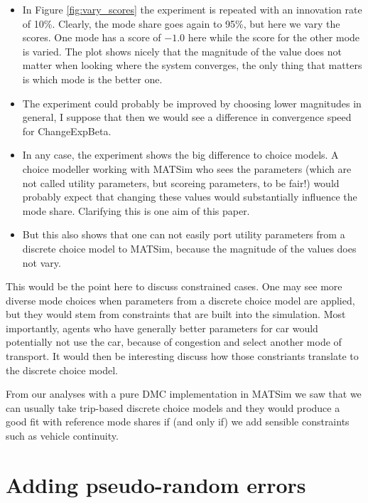 \documentclass[a4paper]{article}
\begin{document}
\begin{itemize}
  \item In Figure \ref{fig:vary_scores} the experiment is repeated with an
  innovation rate of 10\%. Clearly, the mode share goes again
  to 95\%, but here we vary the scores. One mode has a score of $-1.0$ here
  while the score for the other mode is varied. The plot shows nicely that
  the magnitude of the value does not matter when looking where the system
  converges, the only thing that matters is which mode is the better
  one.
  \item The experiment could probably be improved by choosing lower
  magnitudes in general, I suppose that then we would see a difference in
  convergence speed for ChangeExpBeta.
  \item In any case, the experiment shows the big difference to choice models.
  A choice modeller working with MATSim who sees the parameters (which are not
  called utility parameters, but scoreing parameters, to be fair!) would
  probably expect that changing these values would substantially influence
  the mode share. Clarifying this is one aim of this paper.
  \item But this also shows that one can not easily port utility parameters
  from a discrete choice model to MATSim, because the magnitude of the values
  does not vary.
\end{itemize}

This would be the point here to discuss constrained cases. One may see more
diverse mode choices when parameters from a discrete choice model are applied,
but they would stem from constraints that are built into the simulation.
Most importantly, agents who have generally better parameters for car would
potentially not use the car, because of congestion and select another
mode of transport. It would then be interesting discuss how those constriants
translate to the discrete choice model.

From our analyses with a pure DMC implementation in MATSim we saw that we can
usually take trip-based discrete choice models and they would produce a good
fit with reference mode shares if (and only if) we add sensible constraints
such as vehicle continuity.

\section{Adding pseudo-random errors}
\end{document}
